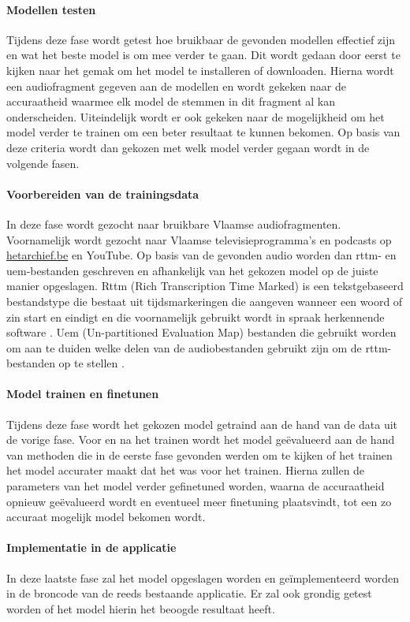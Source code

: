 \paragraph{Modellen testen}
Tijdens deze fase wordt getest hoe bruikbaar de gevonden modellen effectief zijn en wat het beste model is om mee verder te gaan. Dit wordt gedaan door eerst te kijken naar het gemak om het model te installeren of downloaden. Hierna wordt een audiofragment gegeven aan de modellen en wordt gekeken naar de accuraatheid waarmee elk model de stemmen in dit fragment al kan onderscheiden. Uiteindelijk wordt er ook gekeken naar de mogelijkheid om het model verder te trainen om een beter resultaat te kunnen bekomen. Op basis van deze criteria wordt dan gekozen met welk model verder gegaan wordt in de volgende fasen.

\paragraph{Voorbereiden van de trainingsdata}
In deze fase wordt gezocht naar bruikbare Vlaamse audiofragmenten. Voornamelijk wordt gezocht naar Vlaamse televisieprogramma's en podcasts op \url{hetarchief.be} en YouTube. Op basis van de gevonden audio worden dan rttm- en uem-bestanden geschreven en afhankelijk van het gekozen model op de juiste manier opgeslagen. Rttm (Rich Transcription Time Marked) is een tekstgebaseerd bestandstype die bestaat uit tijdsmarkeringen die aangeven wanneer een woord of zin start en eindigt en die voornamelijk gebruikt wordt in spraak herkennende software \autocite{filext}. Uem (Un-partitioned Evaluation Map) bestanden die gebruikt worden om aan te duiden welke delen van de audiobestanden gebruikt zijn om de rttm-bestanden op te stellen \autocite{Ryant}.

\paragraph{Model trainen en finetunen}
Tijdens deze fase wordt het gekozen model getraind aan de hand van de data uit de vorige fase. Voor en na het trainen wordt het model geëvalueerd aan de hand van methoden die in de eerste fase gevonden werden om te kijken of het trainen het model accurater maakt dat het was voor het trainen. Hierna zullen de parameters van het model verder gefinetuned worden, waarna de accuraatheid opnieuw geëvalueerd wordt en eventueel meer finetuning plaatsvindt, tot een zo accuraat mogelijk model bekomen wordt.

\paragraph{Implementatie in de applicatie}
In deze laatste fase zal het model opgeslagen worden en geïmplementeerd worden in de broncode van de reeds bestaande applicatie. Er zal ook grondig getest worden of het model hierin het beoogde resultaat heeft.


